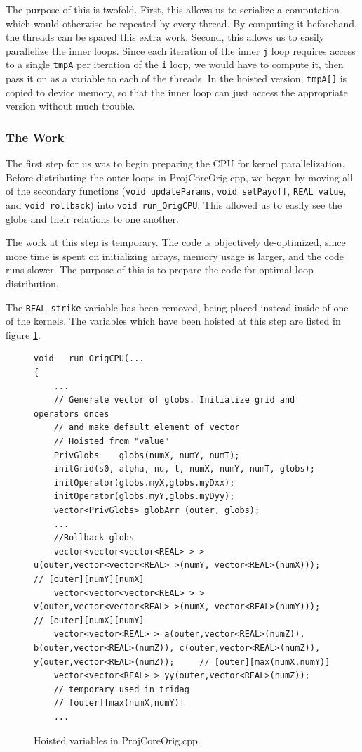 \documentclass[12pt, oneside]{article}
\begin{document}
The purpose of this is twofold. First, this allows us to serialize a computation which would otherwise be repeated by every thread. By computing it beforehand, the threads can be spared this extra work. Second, this allows us to easily parallelize the inner loops. Since each iteration of the inner \texttt{j} loop requires access to a single \texttt{tmpA} per iteration of the \texttt{i} loop, we would have to compute it, then pass it on as a variable to each of the threads. In the hoisted version, \texttt{tmpA[]} is copied to device memory, so that the inner loop can just access the appropriate version without much trouble.
\subsubsection{The Work}
The first step for us was to begin preparing the CPU for kernel parallelization. Before distributing the outer loops in ProjCoreOrig.cpp, we began by moving all of the secondary functions (\texttt{void updateParams}, \texttt{void setPayoff}, \texttt{REAL value}, and \texttt{void rollback}) into \texttt{void run\_OrigCPU}. This allowed us to easily see the globs and their relations to one another.
		
The work at this step is temporary. The code is objectively de-optimized, since more time is spent on initializing arrays, memory usage is larger, and the code runs slower. The purpose of this is to prepare the code for optimal loop distribution.
		
The \texttt{REAL strike} variable has been removed, being placed instead inside of one of the kernels. The variables which have been hoisted at this step are listed in figure \ref{fig:globs}.
\begin{figure}[h]
\begin{lstlisting}
void   run_OrigCPU(...
{   
	...
	// Generate vector of globs. Initialize grid and operators onces
	// and make default element of vector
	// Hoisted from "value"
	PrivGlobs    globs(numX, numY, numT);
	initGrid(s0, alpha, nu, t, numX, numY, numT, globs);
	initOperator(globs.myX,globs.myDxx);
	initOperator(globs.myY,globs.myDyy);
	vector<PrivGlobs> globArr (outer, globs);
	...
	//Rollback globs
	vector<vector<vector<REAL> > > u(outer,vector<vector<REAL> >(numY, vector<REAL>(numX)));   // [outer][numY][numX]
	vector<vector<vector<REAL> > > v(outer,vector<vector<REAL> >(numX, vector<REAL>(numY)));   // [outer][numX][numY]
	vector<vector<REAL> > a(outer,vector<REAL>(numZ)), b(outer,vector<REAL>(numZ)), c(outer,vector<REAL>(numZ)), y(outer,vector<REAL>(numZ));     // [outer][max(numX,numY)]
	vector<vector<REAL> > yy(outer,vector<REAL>(numZ));  
	// temporary used in tridag  
	// [outer][max(numX,numY)]
	...
\end{lstlisting}
\caption{ \label{fig:globs} Hoisted variables in ProjCoreOrig.cpp. }
\end{figure}
			
\end{document}
